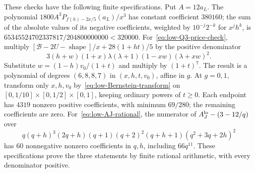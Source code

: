 These checks have the following finite specifications.
Put $A=12a_L$.  The polynomial
$1800A^3P_{f(h)-2x/5}(a_L)/x^3$ has constant coefficient $380160$;
the sum of the absolute values of its negative coefficients, weighted
by $10^{-j}2^{-k}$ for $x^jh^k$, is
$65345524702337817/204800000000<320000$.
For~\eqref{eq:low-Q3-price-check}, multiply
$[\mathcal B-2U-\operatorname{shape}]/x+28(1+ht)/5$ by the
positive denominator
\[
 3(h+w)(1+x)\lambda(\lambda+1)(1-xw)(\lambda+xw)^2.
\]
Substitute $w=(1-h)v_0/(1+t)$ and multiply by $(1+t)^7$.
The result is a polynomial of degrees $(6,8,8,7)$ in
$(x,h,t,v_0)$, affine in $g$.  At $g=0,1$, transform only
$x,h,v_0$ by~\eqref{eq:low-Bernstein-transform} on
$[0,1/10]\times[0,1/2]\times[0,1]$, keeping ordinary powers of
$t\ge0$.  Each endpoint has $4319$ nonzero positive coefficients,
with minimum $69/280$; the remaining coefficients are zero.
For~\eqref{eq:low-AJ-rational}, the numerator of
$A_J^{\rm lo}-(3-12/q)$ over
\[
 q(q+h)^3(2q+h)(q+1)(q+2)^2(q+h+1)(q^2+3q+2h)^2
\]
has $60$ nonnegative nonzero coefficients in $q,h$, including
$66q^{11}$.  These specifications prove the three statements by
finite rational arithmetic, with every denominator positive.

